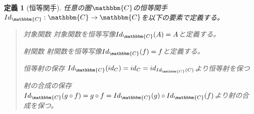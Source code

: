 \documentclass[uplatex,dvipdfmx]{jsarticle}
\newcommand{\cat}[1]{\mathbbm{#1}}
\newcommand{\arrow}{\rightarrow}
\newcommand{\functor}[3]{#1:\cat{#2}\arrow \cat{#3}}
\newtheorem{define}[proof]{定義}
\numberwithin{proof}{subsection}
\newenvironment{mydescription}
{\begin{description}
  \setlength{\parskip}{0.5cm}
}
{\end{description}}
\begin{document}
	\begin{define}[恒等関手]
		任意の圏$\cat{C}$の恒等関手$\functor{Id_{\cat{C}}}{C}{C}$を以下の要素で定義する。
		\begin{quote}
			\begin{mydescription}
				\item[対象関数] 対象関数を恒等写像$Id_{\cat{C}}(A)=A$と定義する。
				\item[射関数] 射関数を恒等写像$Id_{\cat{C}}(f)=f$と定義する。
				\item[恒等射の保存] $Id_{\cat{C}}(id_C)=id_C=id_{Id_{\cat{C}}(C)}$より恒等射を保つ
				\item[射の合成の保存] $Id_{\cat{C}}(g\circ f)=g\circ f=Id_{\cat{C}}(g)\circ Id_{\cat{C}}(f)$より射の合成を保つ。
			\end{mydescription}
		\end{quote}
	\end{define}
\end{document}
